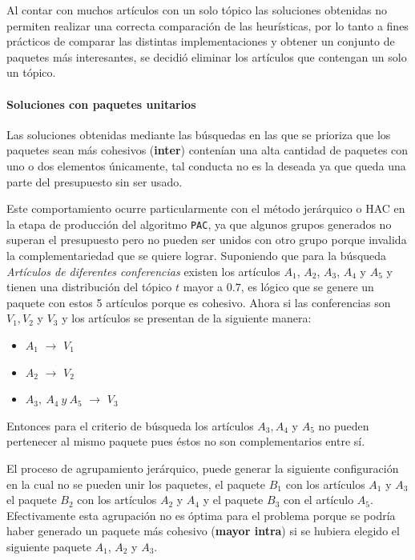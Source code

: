 Al contar con muchos artículos con un solo tópico las soluciones obtenidas no permiten realizar una correcta comparación de las heurísticas, por lo tanto a fines prácticos de comparar las distintas implementaciones y obtener un conjunto de paquetes más interesantes, se decidió eliminar los artículos que contengan un solo un tópico.
\paragraph{Soluciones con paquetes unitarios}
Las soluciones obtenidas mediante las búsquedas en las que se prioriza que los paquetes sean más cohesivos (\textbf{inter}) contenían una alta cantidad de paquetes con uno o dos elementos únicamente, tal conducta no es la deseada ya que queda una parte del presupuesto sin ser usado.

Este comportamiento ocurre particularmente con el método jerárquico o HAC en la etapa de producción del algoritmo \texttt{PAC}, ya que algunos grupos generados no superan el presupuesto pero no pueden ser unidos con otro grupo porque invalida la complementariedad que se quiere lograr. Suponiendo que para la búsqueda \textit{Artículos de diferentes conferencias} existen los artículos $A_1$, $A_2$, $A_3$, $A_4$ y $A_5$ y tienen una distribución del tópico $t$ mayor a $0.7$, es lógico que se genere un paquete con estos 5 artículos porque es cohesivo. Ahora si las conferencias son $V_1, V_2$ y $V_3$ y los artículos se presentan de la siguiente manera:
\begin{itemize}
	\item $A_1$ $\rightarrow$ $V_1$
	\item $A_2$ $\rightarrow$ $V_2$
	\item $A_3,\ A_4\ y\ A_5$ $\rightarrow$ $V_3$
\end{itemize} 

Entonces para el criterio de búsqueda los artículos $A_3, A_4$ y $A_5$ no pueden pertenecer al mismo paquete pues éstos no son complementarios entre sí.

El proceso de agrupamiento jerárquico, puede generar la siguiente configuración en la cual no se pueden unir los paquetes, el paquete $B_1$ con los artículos $A_1$ y $A_3$ el paquete $B_2$ con los artículos $A_2$ y $A_4$ y el paquete $B_3$ con el artículo $A_5$. Efectivamente esta agrupación no es óptima para el problema porque se podría haber generado un paquete más cohesivo (\textbf{mayor intra}) si se hubiera elegido el siguiente paquete $A_1$, $A_2$ y $A_3$.

